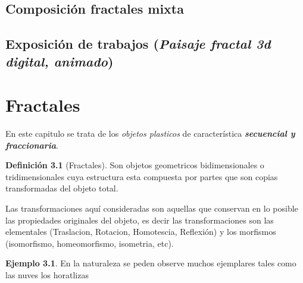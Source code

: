 \documentclass[
  11pt,
]{krantz}
\theoremstyle{definition}
\newtheorem{definition}{Definición}[chapter]
\theoremstyle{definition}
\newtheorem{example}{Ejemplo}[chapter]
\theoremstyle{definition}
\theoremstyle{definition}
\theoremstyle{remark}
\begin{document}
\hypertarget{composiciuxf3n-fractales-mixta}{%
\section{Composición fractales mixta}\label{composiciuxf3n-fractales-mixta}}

\hypertarget{exposiciuxf3n-de-trabajos}{%
\section{\texorpdfstring{Exposición de trabajos (\emph{Paisaje fractal 3d digital, animado})}{Exposición de trabajos ()}}\label{exposiciuxf3n-de-trabajos}}

\hypertarget{fractales}{%
\chapter{Fractales}\label{fractales}}

En este capitulo se trata de los \emph{objetos plasticos} de característica \textbf{\emph{secuencial y fraccionaria}}.

\begin{definition}[Fractales]
\protect\hypertarget{def:fractal}{}\label{def:fractal}Son objetos geometricos bidimensionales o tridimensionales cuya estructura esta compuesta por partes que son copias transformadas del objeto total.
\end{definition}

Las transformaciones aquí consideradas son aquellas que conservan en lo posible las propiedades originales del objeto, es decir las transformaciones son las elementales (Traslacion, Rotacion, Homotescia, Reflexión) y los morfismos (isomorfismo, homeomorfismo, isometria, etc).

\begin{example}
\protect\hypertarget{exm:unnamed-chunk-3}{}\label{exm:unnamed-chunk-3}En la naturaleza se peden observe muchos ejemplares tales como las nuves los horatlizas
\end{example}
\end{document}
